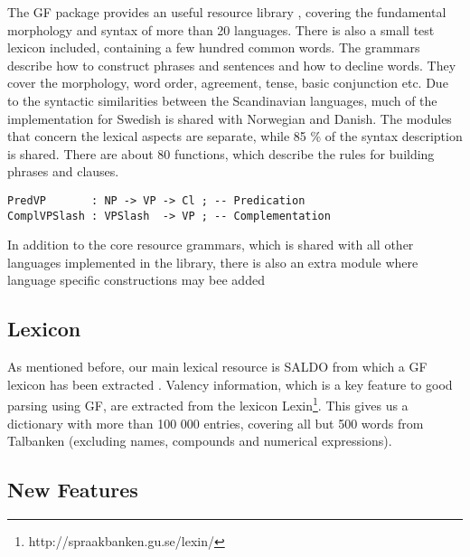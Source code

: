 \documentclass[runningheads,a4paper]{llncs}
\begin{document}
The GF package provides an useful resource library \cite{gf-resource}, covering the
fundamental morphology and syntax of more than 20 languages.
There is also a small test lexicon included, containing a few hundred common
words.
The grammars describe how to construct phrases and sentences and how to
decline words. They cover the morphology,
word order, agreement, tense, basic conjunction etc.
Due to the syntactic similarities between the Scandinavian languages, much of
the implementation for Swedish is shared with Norwegian and Danish. The modules
that concern the lexical aspects are separate, while 85 \% of the syntax
description is shared.  There are about 80 functions, which describe the rules
for building phrases and clauses.
\begin{verbatim}
PredVP       : NP -> VP -> Cl ; -- Predication
ComplVPSlash : VPSlash  -> VP ; -- Complementation
\end{verbatim}
In addition to the core resource grammars, which is shared with all other
languages implemented in the library, there is also an extra module
where language specific constructions may bee added


\subsection{Lexicon}

%
As mentioned before, our main lexical resource is SALDO \cite{saldo} from
which a GF lexicon has been extracted \cite{ahlbergEnache}.
Valency information, which is a key feature to good parsing using GF,
are extracted from the lexicon
Lexin\footnote{http://spraakbanken.gu.se/lexin/}.
This gives us a dictionary with more than 100 000 entries, covering all but 500
words from Talbanken (excluding names, compounds and numerical expressions).

\subsection{New Features}
\end{document}
